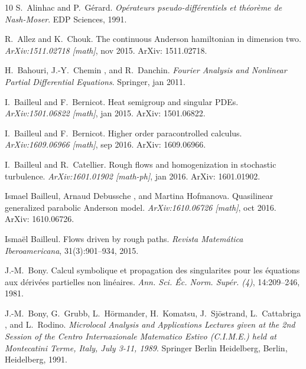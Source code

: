 \documentclass[11pt,reqno]{amsart}
\newcommand{\tmtextit}[1]{{\itshape{#1}}}
\begin{document}
\begin{thebibliography}{10}
  S.~Alinhac  and 
  P.~G{\'e}rard.{\newblock} \tmtextit{Op{\'e}rateurs pseudo-diff{\'e}rentiels
  et th{\'e}or{\`e}me de Nash-Moser}.{\newblock} EDP Sciences,
  1991.{\newblock}
  
  R.~Allez  and  K.~Chouk.{\newblock} The
  continuous Anderson hamiltonian in dimension two.{\newblock}
  \tmtextit{ArXiv:1511.02718 [math]}, nov 2015.{\newblock} ArXiv:
  1511.02718.{\newblock}
  
  H.~Bahouri, J.-Y.~Chemin , and 
  R.~Danchin.{\newblock} \tmtextit{Fourier Analysis and Nonlinear Partial
  Differential Equations}.{\newblock} Springer, jan 2011.{\newblock}
  
  I.~Bailleul  and  F.~Bernicot.{\newblock}
  Heat semigroup and singular PDEs.{\newblock} \tmtextit{ArXiv:1501.06822
  [math]}, jan 2015.{\newblock} ArXiv: 1501.06822.{\newblock}
  
  I.~Bailleul  and  F.~Bernicot.{\newblock}
  Higher order paracontrolled calculus.{\newblock} \tmtextit{ArXiv:1609.06966
  [math]}, sep 2016.{\newblock} ArXiv: 1609.06966.{\newblock}
  
  I.~Bailleul  and  R.~Catellier.{\newblock}
  Rough flows and homogenization in stochastic turbulence.{\newblock}
  \tmtextit{ArXiv:1601.01902 [math-ph]}, jan 2016.{\newblock} ArXiv:
  1601.01902.{\newblock}
  
  Ismael Bailleul, Arnaud Debussche , and  Martina
  Hofmanova.{\newblock} Quasilinear generalized parabolic Anderson
  model.{\newblock} \tmtextit{ArXiv:1610.06726 [math]}, oct 2016.{\newblock}
  ArXiv: 1610.06726.{\newblock}
  
  Isma{\"e}l Bailleul.{\newblock} Flows driven
  by rough paths.{\newblock} \tmtextit{Revista Matem{\'a}tica Iberoamericana},
  31(3):901--934, 2015.{\newblock}
  
  J.-M.~Bony.{\newblock} Calcul symbolique et propagation
  des singularites pour les {\'e}quations aux d{\'e}riv{\'e}es partielles non
  lin{\'e}aires.{\newblock} \tmtextit{Ann. Sci. {\'E}c. Norm. Sup{\'e}r. (4)},
  14:209--246, 1981.{\newblock}
  
  J.-M.~Bony, G.~Grubb, L.~H{\"o}rmander,
  H.~Komatsu, J.~Sj{\"o}strand, L.~Cattabriga , and  L.~Rodino.{\newblock}
  \tmtextit{Microlocal Analysis and Applications Lectures given at the 2nd
  Session of the Centro Internazionale Matematico Estivo (C.I.M.E.) held at
  Montecatini Terme, Italy, July 3-11, 1989}.{\newblock} Springer Berlin
  Heidelberg, Berlin, Heidelberg, 1991.{\newblock}
  

\end{thebibliography}
\end{document}
